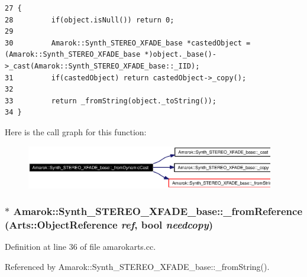 \footnotesize\begin{verbatim}27 {
28         if(object.isNull()) return 0;
29 
30         Amarok::Synth_STEREO_XFADE_base *castedObject = (Amarok::Synth_STEREO_XFADE_base *)object._base()->_cast(Amarok::Synth_STEREO_XFADE_base::_IID);
31         if(castedObject) return castedObject->_copy();
32 
33         return _fromString(object._toString());
34 }
\end{verbatim}\normalsize 


Here is the call graph for this function:\begin{figure}[H]
\begin{center}
\leavevmode
\includegraphics[width=307pt]{classAmarok_1_1Synth__STEREO__XFADE__base_Amarok_1_1Synth__STEREO__XFADE__stube3_cgraph}
\end{center}
\end{figure}
\subsubsection{ $\ast$ Amarok::Synth\_\-STEREO\_\-XFADE\_\-base::\_\-from\-Reference (Arts::Object\-Reference {\em ref}, bool {\em needcopy})\hspace{0.3cm}{\tt  [static, inherited]}}\label{classAmarok_1_1Synth__STEREO__XFADE__base_Amarok_1_1Synth__STEREO__XFADE__stube2}




Definition at line 36 of file amarokarts.cc.

Referenced by Amarok::Synth\_\-STEREO\_\-XFADE\_\-base::\_\-from\-String().




